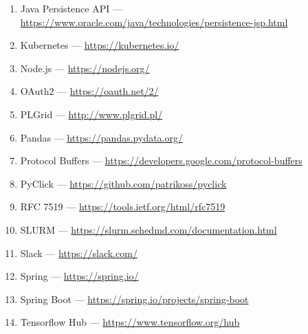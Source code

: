 \begin{enumerate}
    \item Java Persistence API --- \url{https://www.oracle.com/java/technologies/persistence-jsp.html}\label{itm:jpa}
    \item Kubernetes --- \url{https://kubernetes.io/}\label{itm:kubernetes}
    \item Node.js --- \url{https://nodejs.org/}\label{itm:node}
    \item OAuth2 --- \url{https://oauth.net/2/}\label{itm:oauth2}
    \item PLGrid --- \url{http://www.plgrid.pl/}\label{itm:plgrid}
    \item Pandas --- \url{https://pandas.pydata.org/}\label{itm:pandas}
    \item Protocol Buffers --- \url{https://developers.google.com/protocol-buffers}\label{itm:protobuf}
    \item PyClick --- \url{https://github.com/patrikoss/pyclick}\label{itm:pyclick}
    \item RFC 7519 --- \url{https://tools.ietf.org/html/rfc7519}\label{itm:rfc-jwt}
    \item SLURM --- \url{https://slurm.schedmd.com/documentation.html}\label{itm:slurm}
    \item Slack --- \url{https://slack.com/}\label{itm:slack}
    \item Spring --- \url{https://spring.io/}\label{itm:spring}
    \item Spring Boot --- \url{https://spring.io/projects/spring-boot}\label{itm:spring-boot}
    \item Tensorflow Hub --- \url{https://www.tensorflow.org/hub}\label{itm:tensorflow-hub}
\end{enumerate}
\newpage
\thispagestyle{appendix}